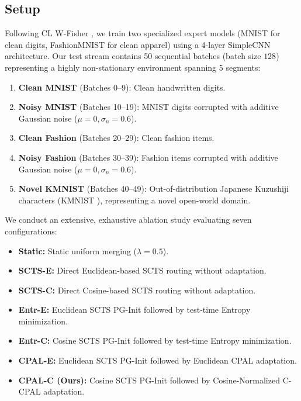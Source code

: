 \documentclass{article}
\theoremstyle{plain}
\theoremstyle{definition}
\theoremstyle{remark}
\begin{document}
\subsection{Setup}
Following CL W-Fisher \cite{clwfisher2026}, we train two specialized expert models (MNIST \cite{lecun98mnist} for clean digits, FashionMNIST \cite{xiao17fashion} for clean apparel) using a 4-layer SimpleCNN architecture. 
Our test stream contains 50 sequential batches (batch size $128$) representing a highly non-stationary environment spanning 5 segments:
\begin{enumerate}
    \item \textbf{Clean MNIST} (Batches 0--9): Clean handwritten digits.
    \item \textbf{Noisy MNIST} (Batches 10--19): MNIST digits corrupted with additive Gaussian noise ($\mu = 0, \sigma_n = 0.6$).
    \item \textbf{Clean Fashion} (Batches 20--29): Clean fashion items.
    \item \textbf{Noisy Fashion} (Batches 30--39): Fashion items corrupted with additive Gaussian noise ($\mu = 0, \sigma_n = 0.6$).
    \item \textbf{Novel KMNIST} (Batches 40--49): Out-of-distribution Japanese Kuzushiji characters (KMNIST \cite{clanuwat18kmnist}), representing a novel open-world domain.
\end{enumerate}

We conduct an extensive, exhaustive ablation study evaluating seven configurations:
\begin{itemize}
    \item \textbf{Static:} Static uniform merging ($\lambda = 0.5$).
    \item \textbf{SCTS-E:} Direct Euclidean-based SCTS routing without adaptation.
    \item \textbf{SCTS-C:} Direct Cosine-based SCTS routing without adaptation.
    \item \textbf{Entr-E:} Euclidean SCTS PG-Init followed by test-time Entropy minimization.
    \item \textbf{Entr-C:} Cosine SCTS PG-Init followed by test-time Entropy minimization.
    \item \textbf{CPAL-E:} Euclidean SCTS PG-Init followed by Euclidean CPAL adaptation.
    \item \textbf{CPAL-C (Ours):} Cosine SCTS PG-Init followed by Cosine-Normalized C-CPAL adaptation.
\end{itemize}
\end{document}

